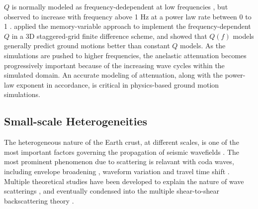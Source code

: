 $Q$ is normally modeled as frequency-dedependent at low frequencies \citep{akiQuantitativeSeismology2002}, but observed to increase with frequency above 1 Hz at a power law rate between 0 to 1 . \citet{withersMemoryEfficientSimulation2015} applied the memory-variable approach \citep{day1984numerical,emmerich1987incorporation,blanch1995modeling} to implement the frequency-dependent $Q$ in a 3D staggered-grid finite difference scheme, and showed that $Q(f)$ models generally predict ground motions better than constant $Q$ models. As the simulations are pushed to higher frequencies, the anelastic attenuation becomes progressively important because of the increasing wave cycles within the simulated domain. An accurate modeling of attenuation, along with the power-law exponent in accordance, is critical in physics-based ground motion simulations.

\subsection{Small-scale Heterogeneities}

The heterogeneous nature of the Earth crust, at different scales, is one of the most important factors governing the propagation of seismic wavefields \citep{levanderSmallscaleHeterogeneityLargescale1992,levanderCrustHeterogeneousOptical1994,beanStatisticalMeasuresCrustal1999,helffrichEarthMantle2001,hedlinSeismicEvidenceSmallscale1997}. The most prominent phenomenon due to scattering is relavant with coda waves, including envelope broadening \citep{satoBroadeningSeismogramEnvelopes1989}, waveform variation and travel time shift \citep{flatteSmallscaleStructureLithosphere1988}. Multiple theoretical studies have been developed to explain the nature of wave scatterings \citep{akiAnalysisSeismicCoda1969, wuMultipleScatteringEnergy1985,akiOriginCodaWaves1975}, and eventually condensed into the multiple shear-to-shear backscattering theory \citep{zengScatteringWaveEnergy1991,zengTheoryScatteredSwave1993,zengSubeventRakeRandom1995}.

